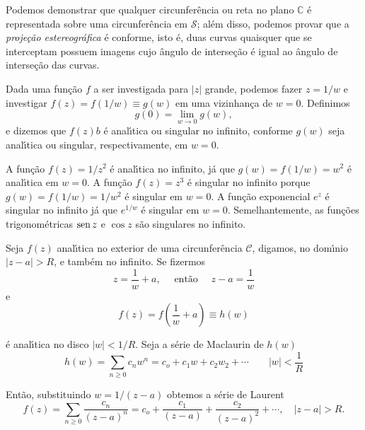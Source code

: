 Podemos demonstrar que qualquer circunfer\^{e}ncia ou reta no plano $\mathbb{C}$ \'{e}
representada sobre uma circunfer\^{e}ncia em $ \mathcal{S}$; al\'{e}m
disso, podemos provar que a \textit{proje\c{c}\~{a}o estereogr\'{a}fica} \'{e} conforme,
isto \'{e}, duas curvas quaisquer que se interceptam possuem imagens
cujo \^{a}ngulo de interse\c{c}\~{a}o \'{e} igual ao \^{a}ngulo de interse\c{c}\~{a}o das
curvas.

Dada uma fun\c{c}\~{a}o $f$ a ser investigada para $| z |$ grande,
podemos fazer $z =1/w$ e investigar $f(z) = f(1/w)\equiv g(w)$ em
uma vizinhan\c{c}a de $w = 0$. Definimos
\begin{equation*}
g(0) = \lim_{w\to 0} g(w),
\end{equation*}
e dizemos que $f(z)b$ \'{e} anal\'{\i}tica ou singular no infinito,
conforme $g(w)$ seja anal\'{\i}tica ou singular, respectivamente, em $w
= 0$.

\begin{exer}\label{infi146:1}
A fun\c{c}\~{a}o $f(z) = 1/z^2$ \'{e} anal\'{\i}tica no infinito, j\'{a} que $g(w) =
f(1/w)=w^2$ \'{e} anal\'{\i}tica em $w=0$. A fun\c{c}\~{a}o $f(z) = z^3$ \'{e} singular
no infinito porque $g(w) =f(1/w) = 1/w^2$ \'{e} singular em $w=0$. A
fun\c{c}\~{a}o exponencial $e^z$ \'{e} singular no infinito j\'{a} que $e^{1/w}$ \'{e}
singular em $w = 0$. Semelhantemente, as fun\c{c}\~{o}es trigonom\'{e}tricas
$\operatorname{sen} z$ e $\cos z$ s\~{a}o singulares no infinito.
\end{exer}

Seja $f(z)$ anal\'{\i}tica no exterior de uma circunfer\^{e}ncia
$\mathcal{C}$, digamos, no dom\'{\i}nio $|z - a| > R$, e tamb\'{e}m no
infinito. Se fizermos
\begin{equation*}
z= \frac{1}{w} + a,\quad \text{ ent\~{a}o }\quad z - a = \frac{1}{w}
\end{equation*}
e
\begin{equation*}
  f(z)=f\left(\frac{1}{w}+a \right)\equiv h(w)
\end{equation*}

\'{e} anal\'{\i}tica no disco $| w | < 1/R$. Seja a s\'{e}rie de Maclaurin de
$h(w)$
\begin{equation*}
h(w) =\sum_{n\geq 0}c_nw^n= c_o + c_1w + c_2w_2 + \cdots\qquad |w|
< \frac{1}{R}
\end{equation*}

Ent\~{a}o, substituindo $w = 1/(z - a)$ obtemos a s\'{e}rie de Laurent
\begin{equation}\label{infi146:2}
f(z) =\sum_{n\geq 0}\frac{c_n}{(z-a)^n}=c_o + \frac{c_1}{(z - a)}
+ \frac{c_2}{(z - a)^2}+\cdots,\quad |z-a|>R.
\end{equation}

